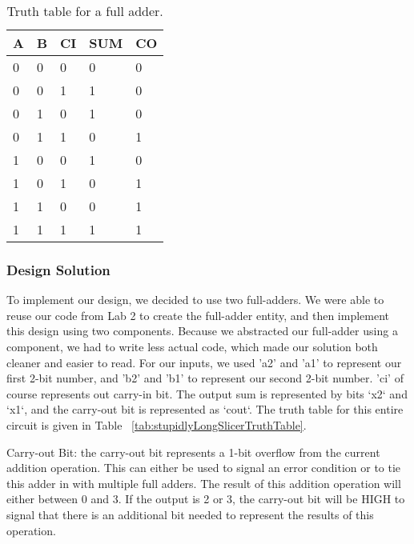 \documentclass[11pt]{article}
\begin{document}
\begin{table}[h]
\begin{center}
	\begin{tabular}{| l | l | l | l | l |}
		\hline
		A & B & CI & SUM & CO \\ \hline
		0 & 0 & 0 & 0 & 0 \\ \hline
		0 & 0 & 1 & 1 & 0 \\ \hline
		0 & 1 & 0 & 1 & 0 \\ \hline
		0 & 1 & 1 & 0 & 1 \\ \hline
		1 & 0 & 0 & 1 & 0 \\ \hline
		1 & 0 & 1 & 0 & 1 \\ \hline
		1 & 1 & 0 & 0 & 1 \\ \hline
		1 & 1 & 1 & 1 & 1 \\ \hline
	\end{tabular}
	\caption{\label{tab:fullAddTruthTable}Truth table for a full adder.}
	\label{tab:fullAddTruthTable}
\end{center}
\end{table}

\subsubsection{Design Solution}
To implement our design, we decided to use two full-adders. We were able to reuse our code from Lab 2 to create the full-adder entity, and then implement this design using two components. Because we abstracted our full-adder using a component, we had to write less actual code, which made our solution both cleaner and easier to read. For our inputs, we used 'a2' and 'a1' to represent our first 2-bit number, and 'b2' and 'b1' to represent our second 2-bit number. 'ci' of course represents out carry-in bit. The output sum is represented by bits `x2` and `x1`, and the carry-out bit is represented as `cout`. The truth table for this entire circuit is given in Table ~\ref{tab:stupidlyLongSlicerTruthTable}.

\begin{definition}
	Carry-out Bit: the carry-out bit represents a 1-bit overflow from the current addition operation. This can either be used to signal an error condition or to tie this adder in with multiple full adders. The result of this addition operation will either between 0 and 3. If the output is 2 or 3, the carry-out bit will be HIGH to signal that there is an additional bit needed to represent the results of this operation.
\end{definition}
\end{document}
